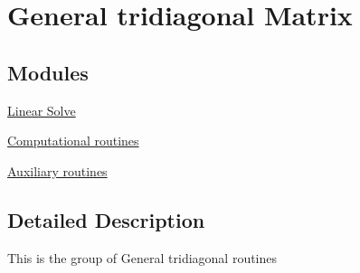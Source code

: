 \hypertarget{group__GT}{}\section{General tridiagonal Matrix}
\label{group__GT}
\subsection*{Modules}
\begin{DoxyCompactItemize}
\item 
\hyperlink{group__solveGT}{Linear Solve}
\item 
\hyperlink{group__computationalGT}{Computational routines}
\item 
\hyperlink{group__auxiliaryGT}{Auxiliary routines}
\end{DoxyCompactItemize}


\subsection{Detailed Description}
This is the group of General tridiagonal routines 